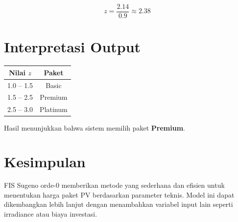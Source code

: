 \documentclass{article}
\begin{document}
\begin{equation}
z = \frac{2.14}{0.9} \approx 2.38
\end{equation}

\section{Interpretasi Output}

\begin{center}
\begin{tabular}{|c|c|}
\hline
Nilai $z$ & Paket \\
\hline
1.0 -- 1.5 & Basic \\
1.5 -- 2.5 & Premium \\
2.5 -- 3.0 & Platinum \\
\hline
\end{tabular}
\end{center}

Hasil menunjukkan bahwa sistem memilih paket \textbf{Premium}.

\section{Kesimpulan}
FIS Sugeno orde-0 memberikan metode yang sederhana dan efisien untuk menentukan harga paket PV berdasarkan parameter teknis. Model ini dapat dikembangkan lebih lanjut dengan menambahkan variabel input lain seperti irradiance atau biaya investasi.
\end{document}
